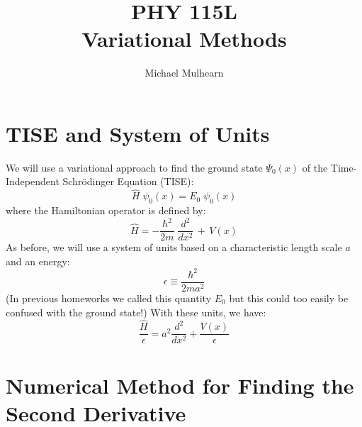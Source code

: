 \documentclass[12pt]{article}
\begin{document}
\newcommand{\ihbar}{\ensuremath{i \hbar}}
\newcommand{\Pss}{\ensuremath{\Psi^*}}
\newcommand{\dPsidt}{\ensuremath{ \frac{\partial \Psi}{\partial t} }}
\newcommand{\dPsidx}{\ensuremath{ \frac{\partial \Psi}{\partial x} }}
\newcommand{\ddPsidx}{\ensuremath{ \frac{\partial^2 \Psi}{\partial x^2} }}
\newcommand{\dPssdt}{\ensuremath{ \frac{\partial \Psi^*}{\partial t} }}
\newcommand{\dPssdx}{\ensuremath{ \frac{\partial \Psi^*}{\partial x} }}
\newcommand{\ddPssdx}{\ensuremath{ \frac{\partial^2 \Psi^*}{\partial x^2} }}

\newcommand{\dphidt}{\ensuremath{ \frac{d \phi}{dt} }}
\newcommand{\dpsidx}{\ensuremath{ \frac{d \psi}{dx} }}
\newcommand{\ddpsidx}{\ensuremath{ \frac{d^2 \psi}{dx^2} }}


\title{PHY 115L \\ Variational Methods}
\author{Michael Mulhearn}

\maketitle

\section{TISE and System of Units}

We will use a variational approach to find the ground state $\Psi_0(x)$ of the Time-Independent Schr\"odinger Equation (TISE):
$$\hat{H} \; \psi_0(x) = E_0 \; \psi_0(x)$$
where the Hamiltonian operator is defined by:
\begin{equation}
\hat{H} = -\frac{\hbar^2}{2 m} \; \frac{d^2}{dx^2} \, + \, V(x)
\end{equation}
As before, we will use a system of units based on a characteristic length scale $a$ and an energy:
\begin{equation}
\epsilon \equiv \frac{\hbar^2}{2ma^2}
\end{equation}
(In previous homeworks we called this quantity $E_0$ but this could too easily be confused with the ground state!)  With these units, we have:
\begin{equation}
\frac{\hat{H}}{\epsilon} = a^2\frac{d^2}{dx^2} + \frac{V(x)}{\epsilon}
\end{equation}

\section{Numerical Method for Finding the Second Derivative}
\end{document}
